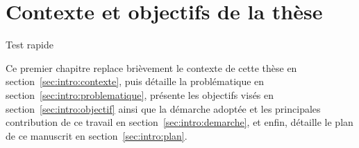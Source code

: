 \chapter{Contexte et objectifs de la thèse}
\chaptertoc

Test rapide

Ce premier chapitre replace brièvement le contexte de cette thèse en section~\ref{sec:intro:contexte}, puis détaille la problématique en section~\ref{sec:intro:problematique}, présente les objectifs visés en section~\ref{sec:intro:objectif} ainsi que la démarche adoptée et les principales contribution de ce travail en section~\ref{sec:intro:demarche}, et enfin, détaille le plan de ce manuscrit en section~\ref{sec:intro:plan}.






